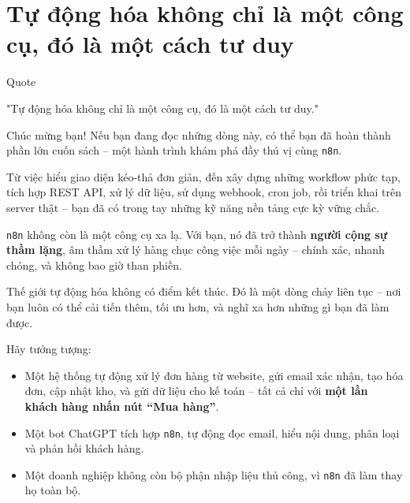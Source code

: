 \chapter{Tự động hóa không chỉ là một công cụ, đó là một cách tư duy}

\begin{infobox}{Quote}
\begin{center}
 "Tự động hóa không chỉ là một công cụ, đó là một cách tư duy."
\end{center}

\end{infobox}

\vspace{1cm}


Chúc mừng bạn! Nếu bạn đang đọc những dòng này, có thể bạn đã hoàn thành phần lớn cuốn sách – một hành trình khám phá đầy thú vị cùng \texttt{n8n}.

Từ việc hiểu giao diện kéo-thả đơn giản, đến xây dựng những workflow phức tạp, tích hợp REST API, xử lý dữ liệu, sử dụng webhook, cron job, rồi triển khai trên server thật – bạn đã có trong tay những kỹ năng nền tảng cực kỳ vững chắc.

\texttt{n8n} không còn là một công cụ xa lạ. Với bạn, nó đã trở thành \textbf{người cộng sự thầm lặng}, âm thầm xử lý hàng chục công việc mỗi ngày – chính xác, nhanh chóng, và không bao giờ than phiền.

\vspace{1em}

Thế giới tự động hóa không có điểm kết thúc. Đó là một dòng chảy liên tục – nơi bạn luôn có thể cải tiến thêm, tối ưu hơn, và nghĩ xa hơn những gì bạn đã làm được.

Hãy tưởng tượng:

\begin{itemize}
    \item Một hệ thống tự động xử lý đơn hàng từ website, gửi email xác nhận, tạo hóa đơn, cập nhật kho, và gửi dữ liệu cho kế toán – tất cả chỉ với \textbf{một lần khách hàng nhấn nút ``Mua hàng''}.
    \item Một bot ChatGPT tích hợp \texttt{n8n}, tự động đọc email, hiểu nội dung, phân loại và phản hồi khách hàng.
    \item Một doanh nghiệp không còn bộ phận nhập liệu thủ công, vì \texttt{n8n} đã làm thay họ toàn bộ.
\end{itemize}


